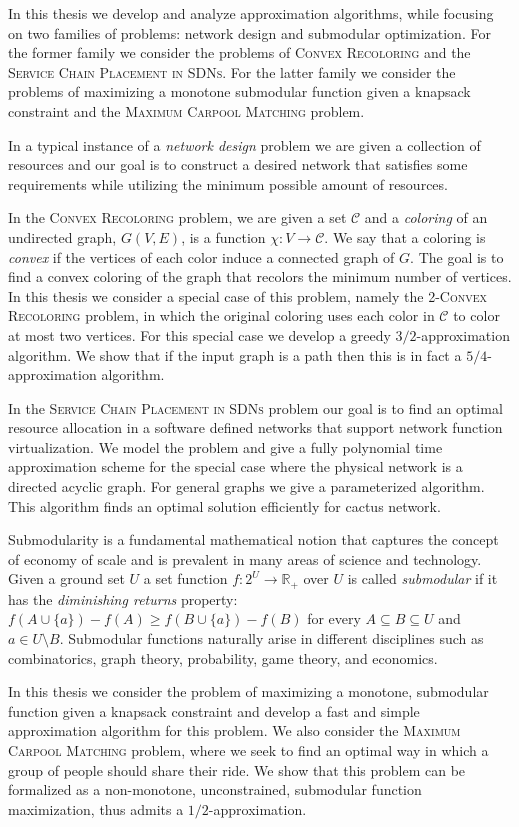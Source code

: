 In this thesis we develop and analyze approximation algorithms, while focusing on two families of problems: network design and submodular optimization.
For the former family we consider the problems of \textsc{Convex Recoloring} and the \textsc{Service Chain Placement in SDNs}.
For the latter family we consider the problems of maximizing a monotone submodular function given a knapsack constraint and the \textsc{Maximum Carpool Matching} problem.

In a typical instance of a \emph{network design} problem we are given a collection of resources and our goal is to construct a desired network that satisfies some requirements while utilizing the minimum possible amount of resources.

In the \textsc{Convex Recoloring} problem, we are given a set $\mathcal{C}$ and a \emph{coloring} of an undirected graph, $G(V, E)$, is a function $\chi:V \to \mathcal{C}$.
We say that a coloring is \emph{convex} if the vertices of each color induce a connected graph of $G$.
The goal is to find a convex coloring of the graph that recolors the minimum number of vertices.
In this thesis we consider a special case of this problem, namely the \textsc{2-Convex Recoloring} problem, in which the original coloring uses each color in $\mathcal{C}$ to color at most two vertices.
For this special case we develop a greedy $3/2$-approximation algorithm.
We show that if the input graph is a path then this is in fact a $5/4$-approximation algorithm.

In the \textsc{Service Chain Placement in SDNs} problem our goal is to find an optimal resource allocation in a software defined networks that support network function virtualization.
We model the problem and give a fully polynomial time approximation scheme for the special case where the physical network is a directed acyclic graph. 
For general graphs we give a parameterized algorithm. 
This algorithm finds an optimal solution efficiently for cactus network.

Submodularity is a fundamental mathematical notion that captures the concept of economy of scale and is prevalent in many areas of science and technology.
Given a ground set $U$ a set function $f:2^U \to \mathbb{R}_+$ over $U$ is called \emph{submodular} if it has the \emph{diminishing returns} property:
$f(A \cup \{a\}) - f(A) \geq f(B \cup \{a\}) - f(B)$ for every $A \subseteq B \subseteq U$ and $a \in U \setminus B$.
Submodular functions naturally arise in different disciplines such as combinatorics, graph theory, probability, game theory, and economics.

In this thesis we consider the problem of maximizing a monotone, submodular function given a knapsack constraint and develop a fast and simple approximation algorithm for this problem.
We also consider the \textsc{Maximum Carpool Matching} problem, where we seek to find an optimal way in which a group of people should share their ride. 
We show that this problem can be formalized as a non-monotone, unconstrained, submodular function maximization, thus admits a $1/2$-approximation.